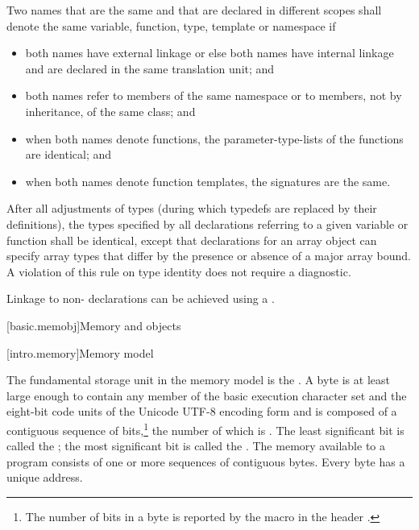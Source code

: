 \pnum
Two names that are the same and that are declared
in different scopes shall denote the same variable, function,
type, template or namespace if
\begin{itemize}
\item both names have external linkage or else both names have internal
linkage and are declared in the same translation unit; and

\item both names refer to members of the same namespace or to members,
not by inheritance, of the same class; and

\item when both names denote functions, the parameter-type-lists of the
functions are identical; and

\item when both names denote function templates, the
signatures are the same.
\end{itemize}

\pnum
{}%
%
After all adjustments of types (during which
typedefs are replaced by their definitions), the
types specified by all declarations referring to a given variable or
function shall be identical, except that declarations for an array
object can specify array types that differ by the presence or absence of
a major array bound. A violation of this rule on type
identity does not require a diagnostic.

\pnum
\begin{note} Linkage to non-\Cpp{} declarations can be achieved using a
. \end{note}%

[basic.memobj]{Memory and objects}

[intro.memory]{Memory model}

\pnum
{}%
The fundamental storage unit in the \Cpp{} memory model is the
.
A byte is at least large enough to contain any member of the basic
%
execution character set
and the eight-bit code units of the Unicode UTF-8 encoding form
and is composed of a contiguous sequence of
bits,\footnote{The number of bits in a byte is reported by the macro
 in the header .}
the number of which is . The least
significant bit is called the ; the most
significant bit is called the . The memory
available to a \Cpp{} program consists of one or more sequences of
contiguous bytes. Every byte has a unique address.


